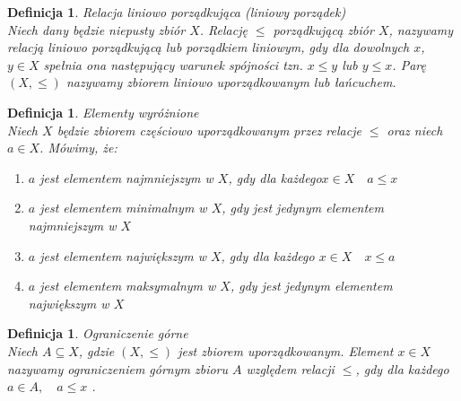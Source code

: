 \documentclass[12pt,a4paper]{report}
\newtheorem{definition}[theorem]{Definicja}
\begin{document}
\begin{definition}{Relacja liniowo porządkująca (liniowy porządek) \cite[Rozdział 2]{blaszczyk2007}}\label{def-porzadek-liniowy}\\
Niech dany będzie niepusty zbiór $X$. Relację $\leq$ porządkującą zbiór $X$, nazywamy relacją liniowo porządkującą lub porządkiem liniowym, gdy dla dowolnych $x$, $y \in X$ spełnia ona następujący warunek spójności tzn. $x \leq y$ lub $y \leq x$. Parę $(X, \leq)$ nazywamy zbiorem liniowo uporządkowanym lub łańcuchem.
\end{definition}


\begin{definition}{Elementy wyróżnione \cite[Rozdział 2]{blaszczyk2007}}\\
Niech $X$ będzie zbiorem częściowo uporządkowanym przez relacje $\leq$ oraz niech $a \in X$. Mówimy, że:
\begin{enumerate}
\item $a$ jest elementem najmniejszym w $X$, gdy dla każdego$x \in X \quad a \leq x$
\item $a$ jest elementem minimalnym w $X$, gdy jest jedynym elementem najmniejszym w $X$
\item $a$ jest elementem największym w $X$, gdy dla każdego $ x \in X \quad x\leq a$
\item $a$ jest elementem maksymalnym w $X$, gdy jest jedynym elementem największym w $X$
\end{enumerate}

\end{definition}


\begin{definition}{Ograniczenie górne \cite[Rozdział 2]{blaszczyk2007}}\\
Niech $A \subseteq X$, gdzie $(X, \leq)$ jest zbiorem uporządkowanym. Element $x \in X$ nazywamy ograniczeniem górnym zbioru $A$ względem relacji $\leq$, gdy dla każdego $a \in A, \quad a \leq x$ . 
\end{definition}
\end{document}
